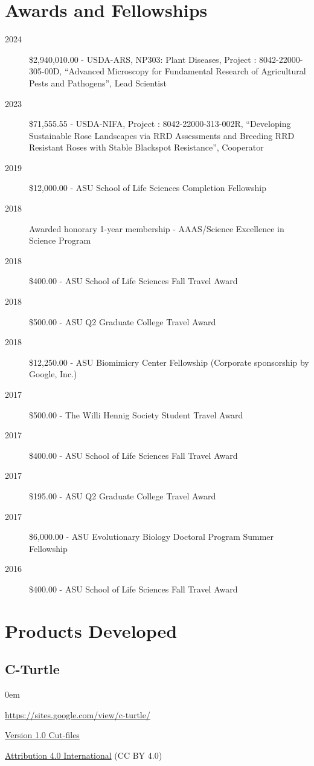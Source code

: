 \documentclass[12pt,a4paper]{article}
\begin{document}
\section*{Awards and Fellowships}
	\begin{description}
		\item [2024] \$2,940,010.00 - USDA-ARS, NP303: Plant Diseases, Project \textnumero: 8042-22000-305-00D, ``Advanced Microscopy for Fundamental Research of Agricultural Pests and Pathogens'', Lead Scientist
		\item [2023] \$71,555.55 - USDA-NIFA, Project \textnumero: 8042-22000-313-002R, ``Developing Sustainable Rose Landscapes via RRD Assessments and Breeding RRD Resistant Roses with Stable Blackspot Resistance'', Cooperator
		\item [2019] \$12,000.00 - ASU School of Life Sciences Completion Fellowship
		\item [2018] Awarded honorary 1-year membership - AAAS/Science Excellence in Science Program
		\item [2018] \$400.00 - ASU School of Life Sciences Fall Travel Award
		\item [2018] \$500.00 - ASU Q2 Graduate College Travel Award
		\item [2018] \$12,250.00 - ASU Biomimicry Center Fellowship (Corporate sponsorship by Google, Inc.)
		\item [2017] \$500.00 - The Willi Hennig Society Student Travel Award
		\item [2017] \$400.00 - ASU School of Life Sciences Fall Travel Award
		\item [2017] \$195.00 - ASU Q2 Graduate College Travel Award
		\item [2017] \$6,000.00 - ASU Evolutionary Biology Doctoral Program Summer Fellowship
		\item [2016] \$400.00 - ASU School of Life Sciences Fall Travel Award
	\end{description}

\section*{Products Developed}
	\subsection*{C-Turtle}
		\begin{description}
			\itemsep0em
			\item[Website] \href{https://sites.google.com/view/c-turtle/}{https://sites.google.com/view/c-turtle/}
			\item[Design] \href{https://drive.google.com/file/d/0BxntR7XVPIVqekR3Sjcyd1hkUm8/view}{Version 1.0 Cut-files}
			\item[License] \href{https://creativecommons.org/licenses/by/4.0/}{Attribution 4.0 International} (CC BY 4.0)
		\end{description}
\end{document}
